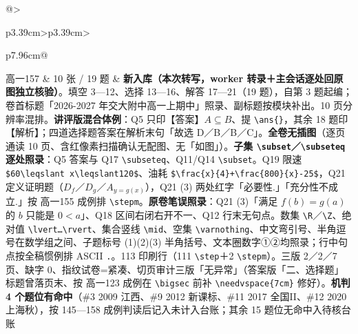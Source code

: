 \documentclass[a4paper,11pt]{article}
\begin{document}
\begin{xltabular}{\textwidth}{@{}>{\raggedright\arraybackslash}p{3.39cm}>{\centering\arraybackslash}p{3.39cm}>{\raggedright\arraybackslash}p{7.96cm}@{}}
高一157 & 10 张 / 19 题 & \textbf{新入库（本次转写，worker 转录＋主会话逐处回原图独立核验）}。填空 3---12、选择 13---16、解答 17---21（19 题），自第 3 题起编；卷首标题「2026-2027 年交大附中高一上期中」照录、副标题按模块补出。10 页分辨率混排。\textbf{讲评版混合体例}：Q5 只印【答案】\(A\subseteq\allowbreak  B\)、提 \texttt{\textbackslash{}ans\{\}}，其余 18 题印【解析】；四道选择题答案在解析末句「故选 D／B／B／C」。\textbf{全卷无插图}（逐页通读 10 页、含红像素扫描确认无配图、无「如图」）。\textbf{子集 \texttt{\textbackslash{}subset}／\texttt{\textbackslash{}subseteq} 逐处照录}：Q5 答案与 Q17 \texttt{\textbackslash{}subseteq}、Q11/Q14 \texttt{\textbackslash{}subset}。Q19 限速 \texttt{\$60\textbackslash{}leqslant\ x\textbackslash{}leqslant120\$}、油耗 \texttt{\$\textbackslash{}frac\{x\}\{4\}+\textbackslash{}frac\{800\}\{x\}-\allowbreak{}25\$}，Q21 定义证明题（\(D_f\)／\(D_g\)／\(A_{y=g(x)}\)），Q21 (3) 两处红字「必要性.」「充分性不成立.」按 高一155 成例排 \texttt{\textbackslash{}stepm}。\textbf{原卷笔误照录}：Q21 (3)「满足 \(f(b)=g(a)\) 的 \(b\) 只能是 \(0<a\)」、Q18 区间右闭右开不一、Q12 行末无句点。数集 \texttt{\textbackslash{}R}／\texttt{\textbackslash{}Z}、绝对值 \texttt{\textbackslash{}lvert…\textbackslash{}rvert}、集合竖线 \texttt{\textbackslash{}mid}、空集 \texttt{\textbackslash{}varnothing}、中文弯引号、半角逗号在数学组之间、子题标号 (1)(2)(3) 半角括号、文本圈数字①②均照录；行中句点按全稿惯例排 ASCII \texttt{.}。113 印刷行（111 \texttt{\textbackslash{}step}＋2 \texttt{\textbackslash{}stepm}）。三版 2／2／7 页、缺字 0、指纹试卷=紧凑、切页审计三版「无异常」（答案版「二、选择题」标题曾落页末、按 高一123 成例在 \texttt{\textbackslash{}bigsec} 前补 \texttt{\textbackslash{}needvspace\{7cm\}} 修好）。\textbf{机判 4 个题位有命中}（\#3 2009 江西、\#9 2012 新课标、\#11 2017 全国II、\#12 2020 上海秋），按 145---158 成例判读后记入未计入台账；其余 15 题位无命中入待核台账 \\ \addlinespace[1pt]

\end{xltabular}
\end{document}
